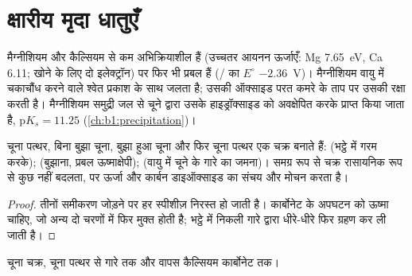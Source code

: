 \section{क्षारीय मृदा धातुएँ}

मैग्नीशियम और कैल्सियम  से कम अभिक्रियाशील हैं (उच्चतर
आयनन ऊर्जाएँ: Mg \qty{7.65}{eV}, Ca 6.11; खोने के लिए दो इलेक्ट्रॉन) पर
फिर भी प्रबल  हैं (/ का $E^\circ$ $-2.36$~V)।
मैग्नीशियम वायु में चकाचौंध करने वाले श्वेत प्रकाश के साथ जलता है; उसकी ऑक्साइड परत
कमरे के ताप पर उसकी रक्षा करती है। मैग्नीशियम समुद्री जल से
चूने द्वारा उसके हाइड्रॉक्साइड को अवक्षेपित करके प्राप्त किया जाता है, $\mathrm{p}K_s = 11.25$
(\cref{ch:b1:precipitation})।

\begin{proposition}[चूना चक्र]\label{prop:b1:s-block:lime-cycle}
चूना पत्थर, बिना बुझा चूना, बुझा हुआ चूना और फिर चूना पत्थर एक चक्र बनाते हैं:
 (भट्ठे में गरम करके); 
(बुझाना, प्रबल ऊष्माक्षेपी);  (वायु में
चूने के गारे का जमना)। समग्र रूप से चक्र रासायनिक रूप से कुछ नहीं बदलता,
पर ऊर्जा और कार्बन डाइऑक्साइड का संचय और मोचन करता है।
\end{proposition}

\begin{proof}
तीनों समीकरण जोड़ने पर हर स्पीशीज़ निरस्त हो जाती है।
कार्बोनेट के अपघटन को ऊष्मा चाहिए, जो अन्य दो चरणों में फिर मुक्त होती है;
भट्ठे में निकली  गारे द्वारा धीरे-धीरे फिर ग्रहण कर ली जाती है।
\end{proof}

\begin{omfigure}

{\small चूना चक्र, चूना पत्थर से गारे तक और वापस कैल्सियम
कार्बोनेट तक।}
\end{omfigure}


